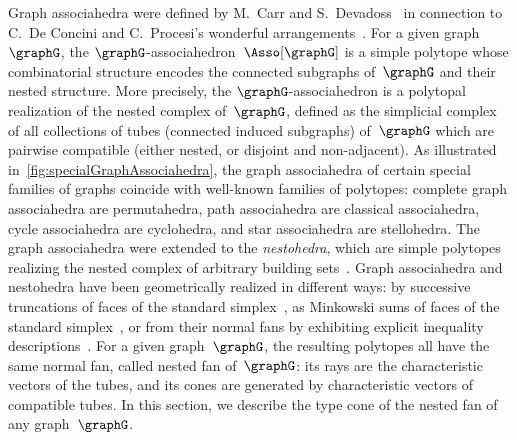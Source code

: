 \documentclass{amsart}
\theoremstyle{definition}
\newcommand{\darkblue}{\color{darkblue}} %
\newcommand{\defn}[1]{\textsl{\darkblue #1}} %
\begin{document}
Graph associahedra were defined by M.~Carr and S.~Devadoss~\cite{CarrDevadoss} in connection to C.~De Concini and C.~Procesi's wonderful arrangements~\cite{DeConciniProcesi}.
For a given graph~$\graphG$, the $\graphG$-associahedron~$\Asso[\graphG]$ is a simple polytope whose combinatorial structure encodes the connected subgraphs of~$\graphG$ and their nested structure.
More precisely, the $\graphG$-associahedron is a polytopal realization of the nested complex of~$\graphG$, defined as the simplicial complex of all collections of tubes (connected induced subgraphs) of~$\graphG$ which are pairwise compatible (either nested, or disjoint and non-adjacent).
As illustrated in~\cref{fig:specialGraphAssociahedra}, the graph associahedra of certain special families of graphs coincide with well-known families of polytopes: complete graph associahedra are permutahedra, path associahedra are classical associahedra, cycle associahedra are cyclohedra, and star associahedra are stellohedra.
The graph associahedra were extended to the \defn{nestohedra}, which are simple polytopes realizing the nested complex of arbitrary building sets~\cite{Postnikov, FeichtnerSturmfels}.
Graph associahedra and nestohedra have been geometrically realized in different ways: by successive truncations of faces of the standard simplex~\cite{CarrDevadoss}, as Minkowski sums of faces of the standard simplex~\cite{Postnikov, FeichtnerSturmfels}, or from their normal fans by exhibiting explicit inequality descriptions~\cite{Devadoss, Zelevinsky}.
For a given graph~$\graphG$, the resulting polytopes all have the same normal fan, called nested fan of~$\graphG$: its rays are the characteristic vectors of the tubes, and its cones are generated by characteristic vectors of compatible tubes.
In this section, we describe the type cone of the nested fan of any graph~$\graphG$.
\end{document}
